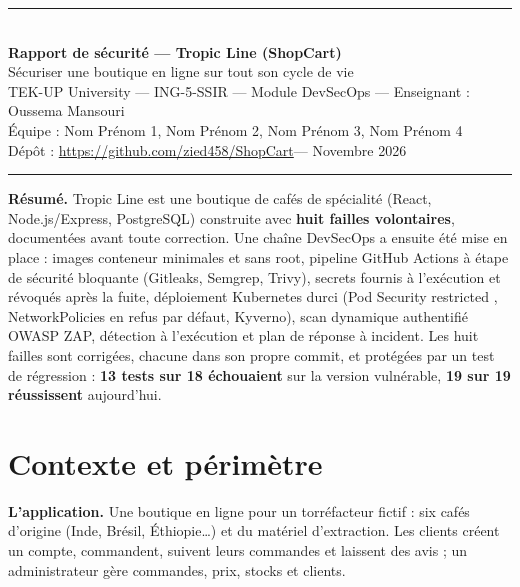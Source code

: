 \documentclass[11pt,a4paper]{article}
\newcommand{\Equipe}{Nom Prénom 1, Nom Prénom 2, Nom Prénom 3, Nom Prénom 4}
\newcommand{\Depot}{\url{https://github.com/zied458/ShopCart}}
\begin{document}
\begin{center}
  {\color{cherry}\rule{\linewidth}{1.2pt}}\\[0.6em]
  {\LARGE\bfseries Rapport de sécurité --- Tropic Line (ShopCart)}\\[0.4em]
  {\large Sécuriser une boutique en ligne sur tout son cycle de vie}\\[0.7em]
  {\small TEK-UP University --- ING-5-SSIR --- Module DevSecOps --- Enseignant : Oussema Mansouri}\\[0.3em]
  {\small Équipe : \Equipe}\\[0.2em]
  {\small Dépôt : \Depot\quad --- \quad Novembre 2026}\\[0.4em]
  {\color{cherry}\rule{\linewidth}{1.2pt}}
\end{center}

\noindent\colorbox{soft}{\parbox{\dimexpr\linewidth-2\fboxsep}{\small
\textbf{Résumé.} Tropic Line est une boutique de cafés de spécialité (React, Node.js/Express, PostgreSQL)
construite avec \textbf{huit failles volontaires}, documentées avant toute correction. Une chaîne DevSecOps
a ensuite été mise en place : images conteneur minimales et sans root, pipeline GitHub Actions à étape de
sécurité bloquante (Gitleaks, Semgrep, Trivy), secrets fournis à l'exécution et révoqués après la fuite,
déploiement Kubernetes durci (Pod Security \og restricted \fg{}, NetworkPolicies en refus par défaut,
Kyverno), scan dynamique authentifié OWASP ZAP, détection à l'exécution et plan de réponse à incident.
Les huit failles sont corrigées, chacune dans son propre commit, et protégées par un test de régression :
\textbf{13 tests sur 18 échouaient} sur la version vulnérable, \textbf{19 sur 19 réussissent} aujourd'hui.}}

\vspace{0.2em}
{\small\tableofcontents}

\section{Contexte et périmètre}

\textbf{L'application.} Une boutique en ligne pour un torréfacteur fictif : six cafés d'origine (Inde,
Brésil, Éthiopie\ldots) et du matériel d'extraction. Les clients créent un compte, commandent, suivent leurs
commandes et laissent des avis ; un administrateur gère commandes, prix, stocks et clients.
\end{document}
